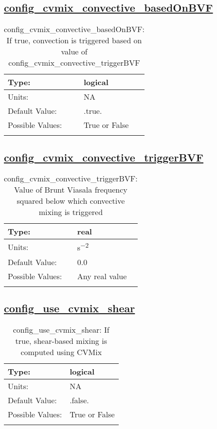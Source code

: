 \subsection[config\_cvmix\_convective\_basedOnBVF]{\hyperref[sec:nm_tab_cvmix]{config\_cvmix\_convective\_basedOnBVF}}
\label{subsec:nm_sec_config_cvmix_convective_basedOnBVF}
\begin{center}
\begin{longtable}{| p{2.0in} || p{4.0in} |}
    \hline
    Type: & logical \\
    \hline
    Units: & \si{NA} \\
    \hline
    Default Value: & .true. \\
    \hline
    Possible Values: & True or False \\
    \hline
    \caption{config\_cvmix\_convective\_basedOnBVF: If true, convection is triggered based on value of config\_cvmix\_convective\_triggerBVF}
\end{longtable}
\end{center}
\subsection[config\_cvmix\_convective\_triggerBVF]{\hyperref[sec:nm_tab_cvmix]{config\_cvmix\_convective\_triggerBVF}}
\label{subsec:nm_sec_config_cvmix_convective_triggerBVF}
\begin{center}
\begin{longtable}{| p{2.0in} || p{4.0in} |}
    \hline
    Type: & real \\
    \hline
    Units: & \si{s^{-2}} \\
    \hline
    Default Value: & 0.0 \\
    \hline
    Possible Values: & Any real value \\
    \hline
    \caption{config\_cvmix\_convective\_triggerBVF: Value of Brunt Viasala frequency squared below which convective mixing is triggered}
\end{longtable}
\end{center}
\subsection[config\_use\_cvmix\_shear]{\hyperref[sec:nm_tab_cvmix]{config\_use\_cvmix\_shear}}
\label{subsec:nm_sec_config_use_cvmix_shear}
\begin{center}
\begin{longtable}{| p{2.0in} || p{4.0in} |}
    \hline
    Type: & logical \\
    \hline
    Units: & \si{NA} \\
    \hline
    Default Value: & .false. \\
    \hline
    Possible Values: & True or False \\
    \hline
    \caption{config\_use\_cvmix\_shear: If true, shear-based mixing is computed using CVMix}
\end{longtable}
\end{center}
